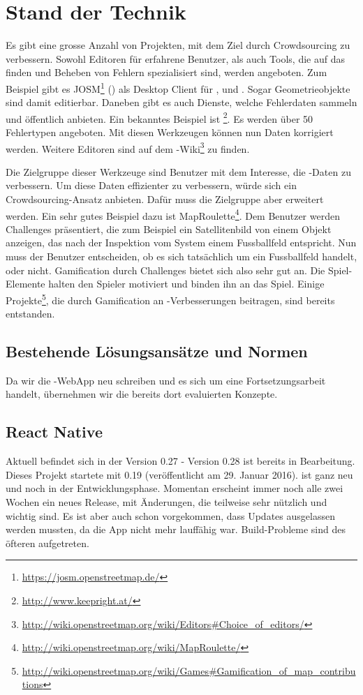 \chapter{Stand der Technik}
\label{tb-stand-der-technik}
Es gibt eine grosse Anzahl von Projekten, mit dem Ziel  durch \gls{Crowdsourcing} zu verbessern.
Sowohl Editoren für erfahrene Benutzer, als auch Tools, die auf das finden und Beheben von Fehlern spezialisiert sind, werden angeboten.
Zum Beispiel gibt es JOSM\footnote{\url{https://josm.openstreetmap.de/}} () als Desktop Client für ,  und .
Sogar Geometrieobjekte sind damit editierbar.
Daneben gibt es auch Dienste, welche Fehlerdaten sammeln und öffentlich anbieten.
Ein bekanntes Beispiel ist \footnote{\url{http://www.keepright.at/}}.
Es werden über 50 Fehlertypen angeboten.
Mit diesen Werkzeugen können nun Daten korrigiert werden.
Weitere Editoren sind auf dem -Wiki\footnote{\url{http://wiki.openstreetmap.org/wiki/Editors\#Choice_of_editors/}} zu finden.

Die Zielgruppe dieser Werkzeuge sind Benutzer mit dem Interesse, die -Daten zu verbessern.
Um diese Daten effizienter zu verbessern, würde sich ein \gls{Crowdsourcing}-Ansatz anbieten.
Dafür muss die Zielgruppe aber erweitert werden.
Ein sehr gutes Beispiel dazu ist MapRoulette\footnote{\url{http://wiki.openstreetmap.org/wiki/MapRoulette/}}.
Dem Benutzer werden Challenges präsentiert, die zum Beispiel ein Satellitenbild von einem Objekt anzeigen, das nach der Inspektion vom System einem Fussballfeld entspricht.
Nun muss der Benutzer entscheiden, ob es sich tatsächlich um ein Fussballfeld handelt, oder nicht.
\gls{Gamification} durch Challenges bietet sich also sehr gut an.
Die Spiel-Elemente halten den Spieler motiviert und binden ihn an das Spiel.
Einige Projekte\footnote{\url{http://wiki.openstreetmap.org/wiki/Games\#Gamification_of_map_contributions}}, die durch \gls{Gamification} an -Verbesserungen beitragen, sind bereits entstanden.

\section{Bestehende Lösungsansätze und Normen}
Da wir die \kort{}-\gls{WebApp} neu schreiben und es sich um eine Fortsetzungsarbeit handelt, übernehmen wir die bereits dort evaluierten Konzepte.


\section{React Native}
Aktuell befindet sich  in der Version 0.27 - Version 0.28 ist bereits in Bearbeitung.
Dieses Projekt startete mit  0.19 (veröffentlicht am 29. Januar 2016).
 ist ganz neu und noch in der Entwicklungsphase.
Momentan erscheint immer noch alle zwei Wochen ein neues Release, mit Änderungen, die teilweise sehr nützlich und wichtig sind.
Es ist aber auch schon vorgekommen, dass Updates ausgelassen werden mussten, da die App nicht mehr lauffähig war.
Build-Probleme sind des öfteren aufgetreten.

